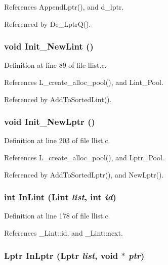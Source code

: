 References Append\-Lptr(), and d\_\-lptr.

Referenced by De\_\-Lptr\-Q().
\subsubsection{\setlength{\rightskip}{0pt plus 5cm}void Init\_\-New\-Lint ()}\label{llist_8h_eda243cd7190cc0ba7b01c985576141f}




Definition at line 89 of file llist.c.

References L\_\-create\_\-alloc\_\-pool(), and Lint\_\-Pool.

Referenced by Add\-To\-Sorted\-Lint().
\subsubsection{\setlength{\rightskip}{0pt plus 5cm}void Init\_\-New\-Lptr ()}\label{llist_8h_622392b18fe97d8f706b69b0b9d7a3e7}




Definition at line 203 of file llist.c.

References L\_\-create\_\-alloc\_\-pool(), and Lptr\_\-Pool.

Referenced by Add\-To\-Sorted\-Lptr(), and New\-Lptr().
\subsubsection{\setlength{\rightskip}{0pt plus 5cm}int In\-Lint (\bf{Lint} {\em list}, int {\em id})}\label{llist_8h_741b1cdeb16cb480a49ad3b39f7b4e7f}




Definition at line 178 of file llist.c.

References \_\-Lint::id, and \_\-Lint::next.
\subsubsection{\setlength{\rightskip}{0pt plus 5cm}\bf{Lptr} In\-Lptr (\bf{Lptr} {\em list}, void $\ast$ {\em ptr})}\label{llist_8h_0ffb12ff243e0d9f8ca3dcf0538a46b3}




